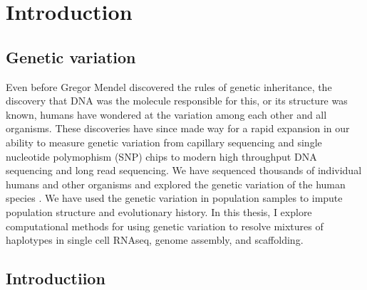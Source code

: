
\chapter{Introduction}

\ifpdf
    \graphicspath{{Chapter1/Figs/Raster/}{Chapter1/Figs/PDF/}{Chapter1/Figs/}}
\else
    \graphicspath{{Chapter1/Figs/Vector/}{Chapter1/Figs/}}
\fi

\section{Genetic variation}

\par{
Even before Gregor Mendel discovered the rules of genetic inheritance\cite{mendel}, the discovery that DNA was the molecule responsible for this\cite{Avery}, or its structure was known\cite{watsoncrick}, humans have wondered at the variation among each other and all organisms. These discoveries have since made way for a rapid expansion in our ability to measure genetic variation from capillary sequencing\cite{capillary} and single nucleotide polymophism (SNP) chips\cite{snpchip} to modern high throughput DNA sequencing\cite{bridgeamp} and long read sequencing\cite{HIFI}. We have sequenced thousands of individual humans and other organisms and explored the genetic variation of the human species \cite{1kgenomes}\cite{1kgenomes2}\cite{haplotypepanel}\cite{ukbiobank}\cite{hapmap}. We have used the genetic variation in population samples to impute population structure and evolutionary history\cite{NGSadmix}\cite{angsd}\cite{estimateadmixture}\cite{abbababa}\cite{shapeit4}\cite{beagle}. In this thesis, I explore computational methods for using genetic variation to resolve mixtures of haplotypes in single cell RNAseq, genome assembly, and scaffolding.
} \\ 

\section{Introductiion}

